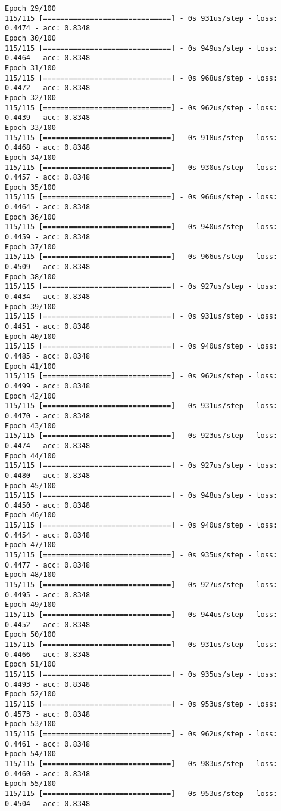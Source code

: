 \documentclass[11pt]{article}
\begin{document}
\begin{Verbatim}[commandchars=\\\{\}]
Epoch 29/100
115/115 [==============================] - 0s 931us/step - loss: 0.4474 - acc: 0.8348
Epoch 30/100
115/115 [==============================] - 0s 949us/step - loss: 0.4464 - acc: 0.8348
Epoch 31/100
115/115 [==============================] - 0s 968us/step - loss: 0.4472 - acc: 0.8348
Epoch 32/100
115/115 [==============================] - 0s 962us/step - loss: 0.4439 - acc: 0.8348
Epoch 33/100
115/115 [==============================] - 0s 918us/step - loss: 0.4468 - acc: 0.8348
Epoch 34/100
115/115 [==============================] - 0s 930us/step - loss: 0.4457 - acc: 0.8348
Epoch 35/100
115/115 [==============================] - 0s 966us/step - loss: 0.4464 - acc: 0.8348
Epoch 36/100
115/115 [==============================] - 0s 940us/step - loss: 0.4459 - acc: 0.8348
Epoch 37/100
115/115 [==============================] - 0s 966us/step - loss: 0.4509 - acc: 0.8348
Epoch 38/100
115/115 [==============================] - 0s 927us/step - loss: 0.4434 - acc: 0.8348
Epoch 39/100
115/115 [==============================] - 0s 931us/step - loss: 0.4451 - acc: 0.8348
Epoch 40/100
115/115 [==============================] - 0s 940us/step - loss: 0.4485 - acc: 0.8348
Epoch 41/100
115/115 [==============================] - 0s 962us/step - loss: 0.4499 - acc: 0.8348
Epoch 42/100
115/115 [==============================] - 0s 931us/step - loss: 0.4470 - acc: 0.8348
Epoch 43/100
115/115 [==============================] - 0s 923us/step - loss: 0.4474 - acc: 0.8348
Epoch 44/100
115/115 [==============================] - 0s 927us/step - loss: 0.4480 - acc: 0.8348
Epoch 45/100
115/115 [==============================] - 0s 948us/step - loss: 0.4450 - acc: 0.8348
Epoch 46/100
115/115 [==============================] - 0s 940us/step - loss: 0.4454 - acc: 0.8348
Epoch 47/100
115/115 [==============================] - 0s 935us/step - loss: 0.4477 - acc: 0.8348
Epoch 48/100
115/115 [==============================] - 0s 927us/step - loss: 0.4495 - acc: 0.8348
Epoch 49/100
115/115 [==============================] - 0s 944us/step - loss: 0.4452 - acc: 0.8348
Epoch 50/100
115/115 [==============================] - 0s 931us/step - loss: 0.4466 - acc: 0.8348
Epoch 51/100
115/115 [==============================] - 0s 935us/step - loss: 0.4493 - acc: 0.8348
Epoch 52/100
115/115 [==============================] - 0s 953us/step - loss: 0.4573 - acc: 0.8348
Epoch 53/100
115/115 [==============================] - 0s 962us/step - loss: 0.4461 - acc: 0.8348
Epoch 54/100
115/115 [==============================] - 0s 983us/step - loss: 0.4460 - acc: 0.8348
Epoch 55/100
115/115 [==============================] - 0s 953us/step - loss: 0.4504 - acc: 0.8348

\end{Verbatim}
\end{document}
